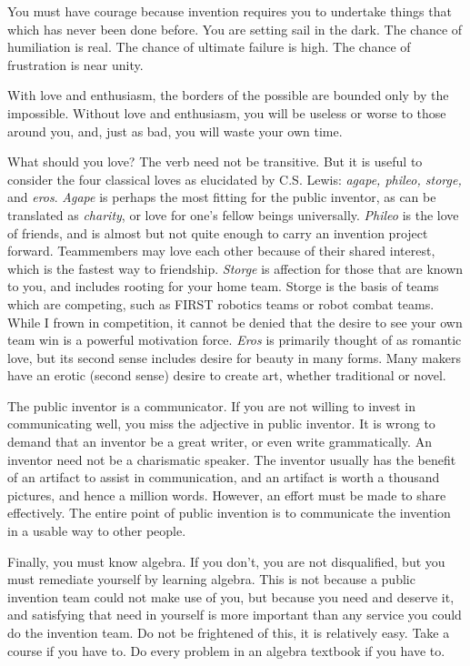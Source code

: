 \documentclass[
	fontsize=10pt, %
	twoside=false, %
	secnumdepth=1, %
]{kaobook}
\begin{document}
You must have courage because invention requires you
to undertake things that
which has never been done before.
You are setting sail in the dark.
The chance of humiliation is real.
The chance of ultimate failure is high.
The chance of frustration is near unity.

With love and enthusiasm, the borders of the
possible are bounded only by the impossible.
Without love and enthusiasm, you will be useless
or worse to those around you, and, just as bad,
you will waste your own time.

What should you love? The verb need not be
transitive. But it is useful to consider
the four classical loves as elucidated by C.S. Lewis:
{\em agape, phileo, storge,} and {\em eros}.\cite{Lewis1960}
{\em Agape} is perhaps the most fitting for
the public inventor, as can be translated as {\em charity},
or love for one's fellow beings universally.
{\em Phileo} is the love of friends, and
is almost but not quite enough to carry an invention project forward.
Teammembers may love each other because of their
shared interest, which is the fastest way to friendship.
{\em Storge} is affection for those that are known to you,
and includes rooting for your home team.
Storge is the basis of teams which are competing, such
as FIRST robotics teams or robot combat teams.
While I frown in competition, it cannot be denied that
the desire to see your own team win is a powerful motivation force.
{\em Eros} is primarily thought of as romantic love, but
its second sense includes desire for beauty in many forms.
Many makers have an erotic (second sense) desire
to create art, whether traditional or novel.

The public inventor is a communicator.
If you are not willing to invest in communicating well,
you miss the adjective in public inventor.
It is wrong to demand that an inventor be a great writer,
or even write grammatically.
An inventor need not be a charismatic speaker.
The inventor usually has the benefit of an artifact to assist
in communication, and an artifact is worth a thousand pictures,
and hence a million words.
However, an effort must be made to share effectively.
The entire point of public invention is to communicate the invention
in a usable way to other people.

Finally, you must know algebra.
If you don't, you are not disqualified,
but you must remediate yourself by learning algebra.
This is not because a public invention team could not make
use of you, but because you need and deserve it, and
satisfying that need in yourself is more important than
any service you could do the invention team.
Do not be frightened of this, it is relatively easy.
Take a course if you have to.
Do every problem in an algebra textbook if you have to.\cite{Moses2001}
\end{document}
